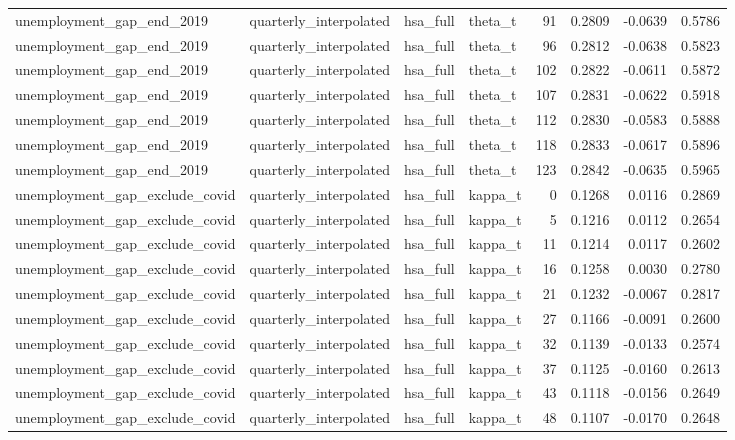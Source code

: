 \begin{tabular}{llllrrrr}
unemployment\_gap\_end\_2019 & quarterly\_interpolated & hsa\_full & theta\_t & 91 & 0.2809 & -0.0639 & 0.5786 \\
unemployment\_gap\_end\_2019 & quarterly\_interpolated & hsa\_full & theta\_t & 96 & 0.2812 & -0.0638 & 0.5823 \\
unemployment\_gap\_end\_2019 & quarterly\_interpolated & hsa\_full & theta\_t & 102 & 0.2822 & -0.0611 & 0.5872 \\
unemployment\_gap\_end\_2019 & quarterly\_interpolated & hsa\_full & theta\_t & 107 & 0.2831 & -0.0622 & 0.5918 \\
unemployment\_gap\_end\_2019 & quarterly\_interpolated & hsa\_full & theta\_t & 112 & 0.2830 & -0.0583 & 0.5888 \\
unemployment\_gap\_end\_2019 & quarterly\_interpolated & hsa\_full & theta\_t & 118 & 0.2833 & -0.0617 & 0.5896 \\
unemployment\_gap\_end\_2019 & quarterly\_interpolated & hsa\_full & theta\_t & 123 & 0.2842 & -0.0635 & 0.5965 \\
unemployment\_gap\_exclude\_covid & quarterly\_interpolated & hsa\_full & kappa\_t & 0 & 0.1268 & 0.0116 & 0.2869 \\
unemployment\_gap\_exclude\_covid & quarterly\_interpolated & hsa\_full & kappa\_t & 5 & 0.1216 & 0.0112 & 0.2654 \\
unemployment\_gap\_exclude\_covid & quarterly\_interpolated & hsa\_full & kappa\_t & 11 & 0.1214 & 0.0117 & 0.2602 \\
unemployment\_gap\_exclude\_covid & quarterly\_interpolated & hsa\_full & kappa\_t & 16 & 0.1258 & 0.0030 & 0.2780 \\
unemployment\_gap\_exclude\_covid & quarterly\_interpolated & hsa\_full & kappa\_t & 21 & 0.1232 & -0.0067 & 0.2817 \\
unemployment\_gap\_exclude\_covid & quarterly\_interpolated & hsa\_full & kappa\_t & 27 & 0.1166 & -0.0091 & 0.2600 \\
unemployment\_gap\_exclude\_covid & quarterly\_interpolated & hsa\_full & kappa\_t & 32 & 0.1139 & -0.0133 & 0.2574 \\
unemployment\_gap\_exclude\_covid & quarterly\_interpolated & hsa\_full & kappa\_t & 37 & 0.1125 & -0.0160 & 0.2613 \\
unemployment\_gap\_exclude\_covid & quarterly\_interpolated & hsa\_full & kappa\_t & 43 & 0.1118 & -0.0156 & 0.2649 \\
unemployment\_gap\_exclude\_covid & quarterly\_interpolated & hsa\_full & kappa\_t & 48 & 0.1107 & -0.0170 & 0.2648 \\

\end{tabular}
